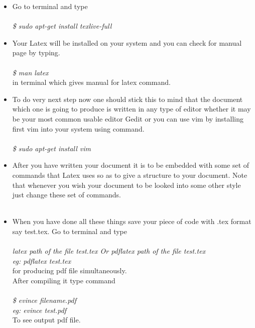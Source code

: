 \begin{itemize}
\item Go to terminal and type\\\\
\textit{\$ sudo apt-get install texlive-full}
\item Your Latex will be installed on your system and you can check for manual page by typing.\\\\
\textit{\$ man latex}\\
in terminal which gives manual for latex command.\\
\item To do very next step now one should stick this to mind that the document which one is going to produce is written in any type of editor whether it may be your most common usable editor Gedit or you can use vim by installing first vim into your system using command.\\\\
\textit{\$ sudo apt-get install vim}\\
\item After you have written your document it is to be embedded with some set of commands that Latex uses so as to give a structure to your document. Note that whenever you wish your document to be looked into some other style just change these set of commands.\\\\
\item When you have done all these things save your piece of code with .tex format say test.tex. Go to terminal and type\\\\
\textit{latex path of the file test.tex Or pdflatex path of the file test.tex\\ eg: pdflatex test.tex}\\
for producing pdf file simultaneously.\\
After compiling it type command\\\\
\textit{\$ evince filename.pdf\\ eg: evince test.pdf}\\
To see output pdf file. 
\end{itemize}

